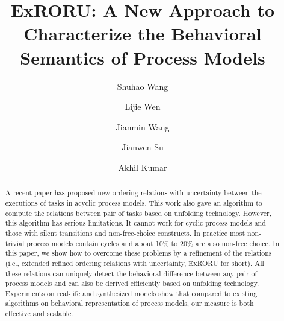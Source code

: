 \documentclass{llncs}
\begin{document}
\frontmatter 
\pagestyle{headings}

\mainmatter
\title{ExRORU: A New Approach to Characterize the Behavioral Semantics of Process Models}

\author[$1$]{Shuhao Wang}
\author[$1$]{Lijie Wen}
\author[$1$]{Jianmin Wang}
\author[$2$]{Jianwen Su}
\author[$3$]{Akhil Kumar}
\institute{}

\maketitle

\begin{abstract}
A recent paper has proposed new ordering relations with uncertainty between the executions of tasks in acyclic process models. This work also gave an algorithm to compute the relations between pair of tasks based on unfolding technology. However, this algorithm has serious limitations. It cannot work for cyclic process models and those with silent transitions and non-free-choice constructs. In practice most non-trivial process models contain cycles and about 10\% to 20\% are also non-free choice. In this paper, we show how to overcome these problems by a refinement of the relations (i.e., extended refined ordering relations with uncertainty, ExRORU for short). All these relations can uniquely detect the behavioral difference between any pair of process models and can also be derived efficiently based on unfolding technology. Experiments on real-life and synthesized models show that compared to existing algorithms on behavioral representation of process models, our measure is both effective and scalable.
\end{abstract}
\end{document}
